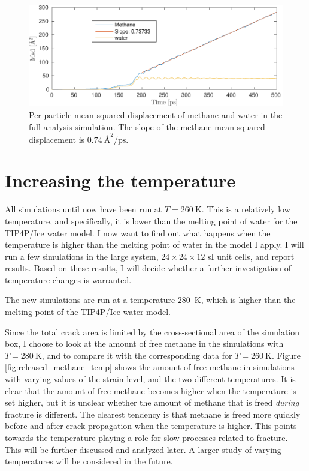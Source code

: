 \begin{figure}
\centering
\includegraphics[width=14cm]{../figures/thesis/methane_crack_diffusion.pdf}
\caption{Per-particle mean squared displacement of methane and water in the full-analysis simulation. The slope of the methane mean squared displacement is $\SI{0.74}{\angstrom\squared\per\pico\second}$.}
\label{fig:msq_methane_crack}
\end{figure}

\section{Increasing the temperature}
All simulations until now have been run at $T=\SI{260}{\kelvin}$. This is a relatively low temperature, and specifically, it is lower than the melting point of water for the TIP4P/Ice water model. I now want to find out what happens when the temperature is higher than the melting point of water in the model I apply. I will  run a few simulations in the large system, $24\times 24\times 12$ sI unit cells, and report results. Based on these results, I will decide whether a further investigation of temperature changes is warranted.

The new simulations are run at a temperature \SI{280}{\kelvin}, which is higher than the melting point of the TIP4P/Ice water model. 

Since the total crack area is limited by the cross-sectional area of the simulation box, I choose to look at the amount of free methane in the simulations with $T = \SI{280}{\kelvin}$, and to compare it with the corresponding data for $T = \SI{260}{\kelvin}$. Figure \ref{fig:released_methane_temp} shows the amount of free methane in simulations with varying values of the strain level, and the two different temperatures. It is clear that the amount of free methane becomes higher when the temperature is set higher, but it is unclear whether the amount of methane that is freed \emph{during} fracture is different. The clearest tendency is that methane is freed more quickly before and after crack propagation when the temperature is higher. This points towards the temperature playing a role for slow processes related to fracture. This will be further discussed and analyzed later. A larger study of varying temperatures will be considered in the future.

